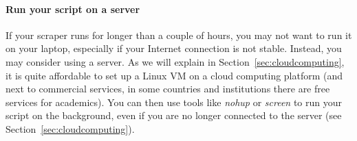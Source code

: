 \paragraph{Run your script on a server} If your scraper runs for longer than a couple of hours, you may not want to run it on your laptop, especially if your Internet connection is not stable. Instead, you may consider using a server. As we will explain in Section~\ref{sec:cloudcomputing}, it is quite affordable to set up a Linux VM on a cloud computing platform (and next to commercial services, in some countries and institutions there are free services for academics). You can then use tools like \emph{nohup} or \emph{screen} to run your script on the background, even if you are no longer connected to the server (see Section~\ref{sec:cloudcomputing}).



